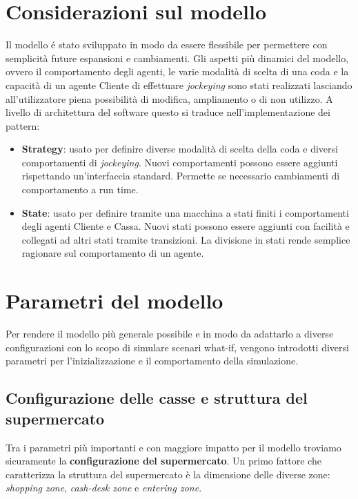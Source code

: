 \section{Considerazioni sul modello}

Il modello é stato sviluppato in modo da essere flessibile per
permettere con semplicità future espansioni e cambiamenti. Gli aspetti
più dinamici del modello, ovvero il comportamento degli agenti, le
varie modalità di scelta di una coda e la capacità di un agente
Cliente di effettuare \textit{jockeying} sono stati realizzati lasciando
all'utilizzatore piena possibilità di modifica, ampliamento o di non
utilizzo. A livello di architettura del software questo si traduce
nell'implementazione dei pattern:

\begin{itemize}
\item \textbf{Strategy}: usato per definire diverse modalità di scelta
  della coda e diversi comportamenti di \textit{jockeying}. Nuovi comportamenti
  possono essere aggiunti rispettando un'interfaccia standard. Permette se necessario cambiamenti di comportamento a run time.
\item \textbf{State}: usato per definire tramite una macchina a stati
  finiti i comportamenti degli agenti Cliente e Cassa. Nuovi stati
  possono essere aggiunti con facilità e collegati ad altri stati
  tramite transizioni. La divisione in stati rende semplice ragionare
  sul comportamento di un agente.
\end{itemize}

\section{Parametri del modello}
\label{model:parameters}

Per rendere il modello più generale possibile e in modo da adattarlo a diverse configurazioni con lo scopo di simulare scenari what-if, vengono introdotti diversi parametri per l'inizializzazione e il comportamento della simulazione.

\subsection{Configurazione delle casse e struttura del supermercato}
Tra i parametri più importanti e con maggiore impatto per il modello troviamo sicuramente la \textbf{configurazione del supermercato}. Un primo fattore che caratterizza la struttura del supermercato  è la dimensione delle diverse zone: \textit{shopping zone}, \textit{cash-desk zone} e \textit{entering zone}.

